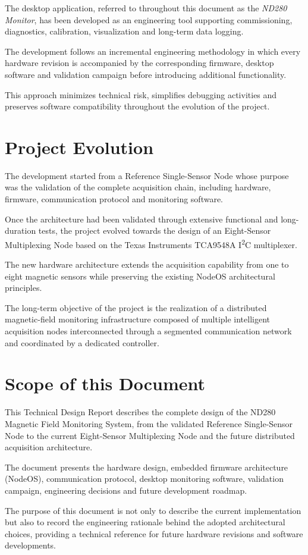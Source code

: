 The desktop application, referred to throughout this document as the \textit{ND280 Monitor}, has been developed as an engineering tool supporting commissioning, diagnostics, calibration, visualization and long-term data logging.

The development follows an incremental engineering methodology in which every hardware revision is accompanied by the corresponding firmware, desktop software and validation campaign before introducing additional functionality.

This approach minimizes technical risk, simplifies debugging activities and preserves software compatibility throughout the evolution of the project.

\section{Project Evolution}

The development started from a Reference Single-Sensor Node whose purpose was the validation of the complete acquisition chain, including hardware, firmware, communication protocol and monitoring software.

Once the architecture had been validated through extensive functional and long-duration tests, the project evolved towards the design of an Eight-Sensor Multiplexing Node based on the Texas Instruments TCA9548A I\textsuperscript{2}C multiplexer.

The new hardware architecture extends the acquisition capability from one to eight magnetic sensors while preserving the existing NodeOS architectural principles.

The long-term objective of the project is the realization of a distributed magnetic-field monitoring infrastructure composed of multiple intelligent acquisition nodes interconnected through a segmented communication network and coordinated by a dedicated controller.

\section{Scope of this Document}

This Technical Design Report describes the complete design of the ND280 Magnetic Field Monitoring System, from the validated Reference Single-Sensor Node to the current Eight-Sensor Multiplexing Node and the future distributed acquisition architecture.

The document presents the hardware design, embedded firmware architecture (NodeOS), communication protocol, desktop monitoring software, validation campaign, engineering decisions and future development roadmap.

The purpose of this document is not only to describe the current implementation but also to record the engineering rationale behind the adopted architectural choices, providing a technical reference for future hardware revisions and software developments.

